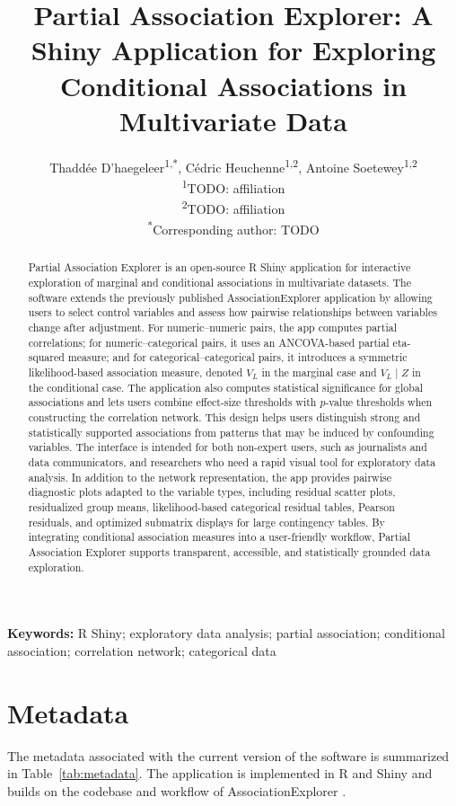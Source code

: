 \documentclass[11pt,a4paper]{article}
\title{Partial Association Explorer: A Shiny Application for Exploring Conditional Associations in Multivariate Data}
\author{
Thaddée D'haegeleer\textsuperscript{1,*},
Cédric Heuchenne\textsuperscript{1,2},
Antoine Soetewey\textsuperscript{1,2}\\
\textsuperscript{1}TODO: affiliation\\
\textsuperscript{2}TODO: affiliation\\
\textsuperscript{*}Corresponding author: TODO
}
\date{}
\begin{document}
\maketitle

\begin{abstract}
Partial Association Explorer is an open-source R Shiny application for interactive exploration of marginal and conditional associations in multivariate datasets. The software extends the previously published AssociationExplorer application by allowing users to select control variables and assess how pairwise relationships between variables change after adjustment. For numeric--numeric pairs, the app computes partial correlations; for numeric--categorical pairs, it uses an ANCOVA-based partial eta-squared measure; and for categorical--categorical pairs, it introduces a symmetric likelihood-based association measure, denoted $V_L$ in the marginal case and $V_L \mid Z$ in the conditional case. The application also computes statistical significance for global associations and lets users combine effect-size thresholds with $p$-value thresholds when constructing the correlation network. This design helps users distinguish strong and statistically supported associations from patterns that may be induced by confounding variables. The interface is intended for both non-expert users, such as journalists and data communicators, and researchers who need a rapid visual tool for exploratory data analysis. In addition to the network representation, the app provides pairwise diagnostic plots adapted to the variable types, including residual scatter plots, residualized group means, likelihood-based categorical residual tables, Pearson residuals, and optimized submatrix displays for large contingency tables. By integrating conditional association measures into a user-friendly workflow, Partial Association Explorer supports transparent, accessible, and statistically grounded data exploration.
\end{abstract}

\noindent\textbf{Keywords:} R Shiny; exploratory data analysis; partial association; conditional association; correlation network; categorical data

\section*{Metadata}

The metadata associated with the current version of the software is summarized in Table~\ref{tab:metadata}. The application is implemented in R and Shiny and builds on the codebase and workflow of AssociationExplorer \cite{soetewey2026associationexplorer}.
\end{document}
